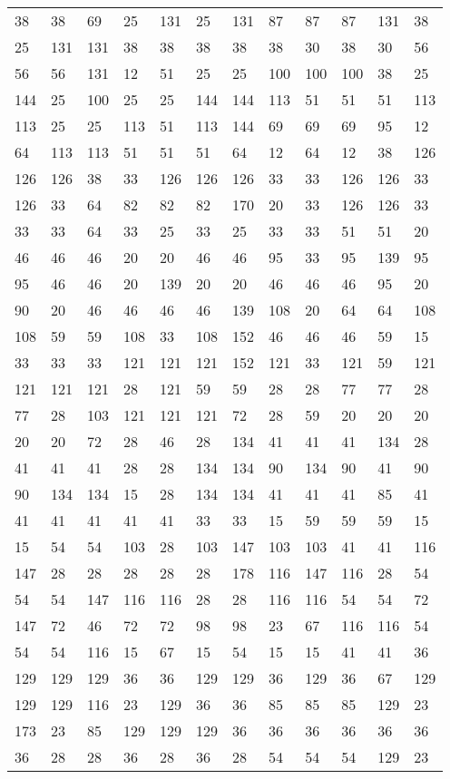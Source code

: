 \begin{longtable}{llllllllllll}
38 &38& 69 &25 &131& 25&131 &87& 87 &87 &131& 38\\
25 &131& 131 &38 &38& 38&38 &38& 30 &38 &30& 56\\
56 &56& 131 &12 &51& 25&25 &100& 100 &100 &38& 25\\
144 &25& 100 &25 &25& 144&144 &113& 51 &51 &51& 113\\
113 &25& 25 &113 &51& 113&144 &69& 69 &69 &95& 12\\
64 &113& 113 &51 &51& 51&64 &12& 64 &12 &38& 126\\
126 &126& 38 &33 &126& 126&126 &33& 33 &126 &126& 33\\
126 &33& 64 &82 &82& 82&170 &20& 33 &126 &126& 33\\
33 &33& 64 &33 &25& 33&25 &33& 33 &51 &51& 20\\
46 &46& 46 &20 &20& 46&46 &95& 33 &95 &139& 95\\
95 &46& 46 &20 &139& 20&20 &46& 46 &46 &95& 20\\
90 &20& 46 &46 &46& 46&139 &108& 20 &64 &64& 108\\
108 &59& 59 &108 &33& 108&152 &46& 46 &46 &59& 15\\
33 &33& 33 &121 &121& 121&152 &121& 33 &121 &59& 121\\
121 &121& 121 &28 &121& 59&59 &28& 28 &77 &77& 28\\
77 &28& 103 &121 &121& 121&72 &28& 59 &20 &20& 20\\
20 &20& 72 &28 &46& 28&134 &41& 41 &41 &134& 28\\
41 &41& 41 &28 &28& 134&134 &90& 134 &90 &41& 90\\
90 &134& 134 &15 &28& 134&134 &41& 41 &41 &85& 41\\
41 &41& 41 &41 &41& 33&33 &15& 59 &59 &59& 15\\
15 &54& 54 &103 &28& 103&147 &103& 103 &41 &41& 116\\
147 &28& 28 &28 &28& 28&178 &116& 147 &116 &28& 54\\
54 &54& 147 &116 &116& 28&28 &116& 116 &54 &54& 72\\
147 &72& 46 &72 &72& 98&98 &23& 67 &116 &116& 54\\
54 &54& 116 &15 &67& 15&54 &15& 15 &41 &41& 36\\
129 &129& 129 &36 &36& 129&129 &36& 129 &36 &67& 129\\
129 &129& 116 &23 &129& 36&36 &85& 85 &85 &129& 23\\
173 &23& 85 &129 &129& 129&36 &36& 36 &36 &36& 36\\
36 &28& 28 &36 &28& 36&28 &54& 54 &54 &129& 23\\

\end{longtable}
